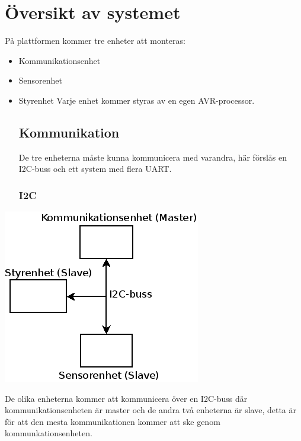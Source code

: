 \documentclass[a4paper,12pt]{article}
\begin{document}
\section{Översikt av systemet}
På plattformen kommer tre enheter att monteras:
\begin{itemize}
        \item Kommunikationsenhet
        \item Sensorenhet
        \item Styrenhet
Varje enhet kommer styras av en egen AVR-processor.
\subsection{Kommunikation}
De tre enheterna måste kunna kommunicera med varandra, här förslås en I2C-buss och ett system med flera UART.
\subsubsection{I2C}
\end{itemize}
\begin{center}
\includegraphics[scale=0.7]{delsystem_i2c.png}
\end{center}
De olika enheterna kommer att kommunicera över en I2C-buss där kommunikationsenheten är master och de andra två enheterna är slave,
detta är för att den mesta kommunikationen kommer att ske genom kommunkationsenheten.
\end{document}
